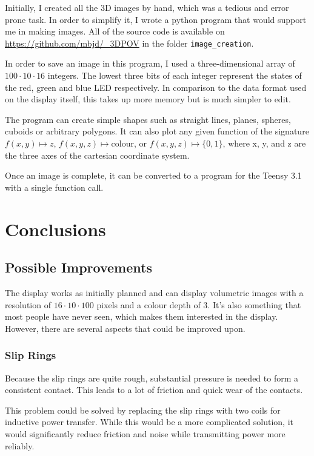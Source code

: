 \documentclass[a4paper, 11pt, titlepage]{article}
\begin{document}
Initially, I created all the 3D images by hand, which was a tedious and error prone task. In order
to simplify it, I wrote a python program that would support me in making images. All of the source
code is available on \url{https://github.com/mbjd/\_3DPOV} in the folder \texttt{image\_creation}.

In order to save an image in this program, I used a three-dimensional array of $100 \cdot 10 \cdot
16$ integers.  The lowest three bits of each integer represent the states of the red, green and
blue LED respectively. In comparison to the data format used on the display itself, this takes up
more memory but is much simpler to edit.

The program can create simple shapes such as straight lines, planes, spheres, cuboids or arbitrary
polygons. It can also plot any given function of the signature $f(x,y) \mapsto z$, $f(x,y,z)
\mapsto \text{colour}$, or $f(x,y,z) \mapsto \{0, 1\} $, where x, y, and z are the three axes of
the cartesian coordinate system.

Once an image is complete, it can be converted to a program for the Teensy 3.1 with a single
function call.


\section{Conclusions}

\subsection{Possible Improvements}

The display works as initially planned and can display volumetric images with a resolution of $16
\cdot 10 \cdot 100$ pixels and a colour depth of \SI{3}{\bit}. It's also something that most
people have never seen, which makes them interested in the display. However, there are several
aspects that could be improved upon.

\subsubsection{Slip Rings}

Because the slip rings are quite rough, substantial pressure is needed to form a consistent
contact. This leads to a lot of friction and quick wear of the contacts.

This problem could be solved by replacing the slip rings with two coils for inductive power
transfer. While this would be a more complicated solution, it would significantly reduce friction
and noise while transmitting power more reliably.
\end{document}
